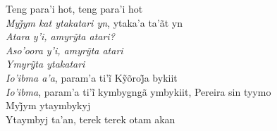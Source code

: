 \begin{linenumbers}\begingroup\raggedright

\noindent   Teng para'i hot, teng para'i hot\\
  \emph{Myj̃ym kat ytakatari yn}, ytaka’a ta’ãt yn\\
  \emph{Atara y’i, amyrỹta atari?}\\
  \emph{Aso’oora y’i, amyrỹta atari}\\
  \emph{Ymyrỹta ytakatari}\\
  \emph{Io’ibma a’a}, param’a ti’ĩ Kỹõroj̃a bykiit\\
  \emph{Io’ibma}, param’a ti’ĩ kymbygngã ymbykiit, Pereira sin tyymo\\
  Myj̃ym ytaymbykyj\\
  Ytaymbyj ta'an, terek terek otam akan

\end{linenumbers}\endgroup

\bigskip

